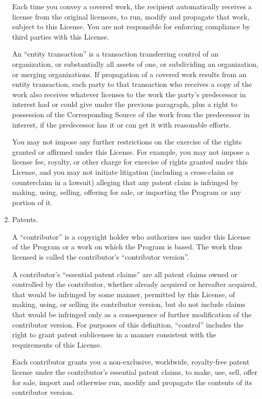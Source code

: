 \documentclass{article}
\begin{document}
\begin{enumerate}
    Each time you convey a covered work, the recipient automatically
    receives a license from the original licensors, to run, modify and
    propagate that work, subject to this License.  You are not responsible
    for enforcing compliance by third parties with this License.
    
    An ``entity transaction'' is a transaction transferring control of an
    organization, or substantially all assets of one, or subdividing an
    organization, or merging organizations.  If propagation of a covered
    work results from an entity transaction, each party to that
    transaction who receives a copy of the work also receives whatever
    licenses to the work the party's predecessor in interest had or could
    give under the previous paragraph, plus a right to possession of the
    Corresponding Source of the work from the predecessor in interest, if
    the predecessor has it or can get it with reasonable efforts.
    
    You may not impose any further restrictions on the exercise of the
    rights granted or affirmed under this License.  For example, you may
    not impose a license fee, royalty, or other charge for exercise of
    rights granted under this License, and you may not initiate litigation
    (including a cross-claim or counterclaim in a lawsuit) alleging that
    any patent claim is infringed by making, using, selling, offering for
    sale, or importing the Program or any portion of it.
    
    \item Patents.
    
    A ``contributor'' is a copyright holder who authorizes use under this
    License of the Program or a work on which the Program is based.  The
    work thus licensed is called the contributor's ``contributor version''.
    
    A contributor's ``essential patent claims'' are all patent claims
    owned or controlled by the contributor, whether already acquired or
    hereafter acquired, that would be infringed by some manner, permitted
    by this License, of making, using, or selling its contributor version,
    but do not include claims that would be infringed only as a
    consequence of further modification of the contributor version.  For
    purposes of this definition, ``control'' includes the right to grant
    patent sublicenses in a manner consistent with the requirements of
    this License.
    
    Each contributor grants you a non-exclusive, worldwide, royalty-free
    patent license under the contributor's essential patent claims, to
    make, use, sell, offer for sale, import and otherwise run, modify and
    propagate the contents of its contributor version.
    

\end{enumerate}
\end{document}
